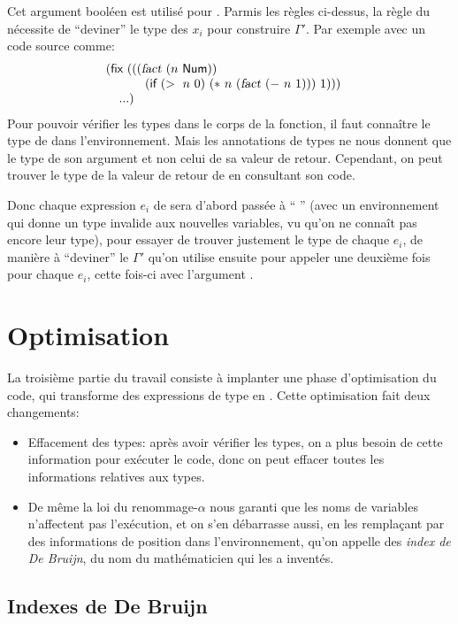\documentclass{article}
\begin{document}
Cet argument booléen est utilisé pour .  Parmis les règles
ci-dessus, la règle du  nécessite de ``deviner'' le type des $x_i$
pour construire $\Gamma'$.  Par exemple avec un code source comme:
\begin{displaymath}
  (\MAlign{
    \kw{fix}~((
    \MAlign{(\id{fact}~(n~\kw{Num})) \\
            ~~(\kw{if}~(>~n~0)~(*~n~(\id{fact}~(-~n~1)))~1)))} \\
    ~~...)}
\end{displaymath}
Pour pouvoir vérifier les types dans le corps de la fonction, il faut
connaître le type de  dans l'environnement.  Mais les
annotations de types ne nous donnent que le type de son argument et non
celui de sa valeur de retour.  Cependant, on peut trouver le type de la
valeur de retour de  en consultant son code.

Donc chaque expression $e_i$ de  sera d'abord passée à ``
'' (avec un environnement qui donne un type invalide aux nouvelles
variables, vu qu'on ne connaît pas encore leur type), pour essayer de
trouver justement le type de chaque $e_i$, de manière à ``deviner'' le $\Gamma'$
qu'on utilise ensuite pour appeler  une deuxième fois pour chaque
$e_i$, cette fois-ci avec l'argument .

\section{Optimisation}

La troisième partie du travail consiste à implanter une phase d'optimisation
du code, qui transforme des expressions de type  en .
Cette optimisation fait deux changements:
\begin{itemize}
\item Effacement des types: après avoir vérifier les types, on a plus besoin
  de cette information pour exécuter le code, donc on peut effacer toutes
  les informations relatives aux types.
\item De même la loi du renommage-$\alpha$ nous garanti que les noms de variables
  n'affectent pas l'exécution, et on s'en débarrasse aussi, en les
  remplaçant par des informations de position dans l'environnement, qu'on
  appelle des \emph{index de De Bruijn}, du nom du mathématicien qui les
  a inventés.
\end{itemize}

\subsection{Indexes de De Bruijn}
\end{document}
